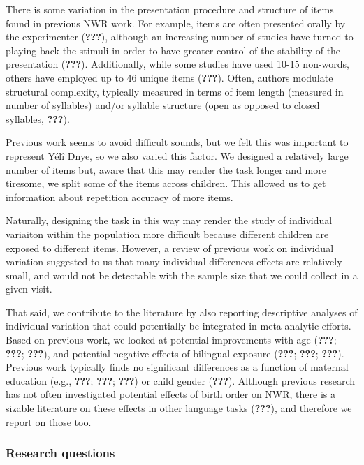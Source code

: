 \documentclass[english,,man,floatsintext]{apa6}
\begin{document}
There is some variation in the presentation procedure and structure of items found in previous NWR work. For example, items are often presented orally by the experimenter ({\textbf{???}}), although an increasing number of studies have turned to playing back the stimuli in order to have greater control of the stability of the presentation ({\textbf{???}}). Additionally, while some studies have used 10-15 non-words, others have employed up to 46 unique items ({\textbf{???}}). Often, authors modulate structural complexity, typically measured in terms of item length (measured in number of syllables) and/or syllable structure (open as opposed to closed syllables, {\textbf{???}}).

Previous work seems to avoid difficult sounds, but we felt this was important to represent Yélî Dnye, so we also varied this factor. We designed a relatively large number of items but, aware that this may render the task longer and more tiresome, we split some of the items across children. This allowed us to get information about repetition accuracy of more items.

Naturally, designing the task in this way may render the study of individual variaiton within the population more difficult because different children are exposed to different items. However, a review of previous work on individual variation suggested to us that many individual differences effects are relatively small, and would not be detectable with the sample size that we could collect in a given visit.

That said, we contribute to the literature by also reporting descriptive analyses of individual variation that could potentially be integrated in meta-analytic efforts. Based on previous work, we looked at potential improvements with age ({\textbf{???}}; {\textbf{???}}; {\textbf{???}}), and potential negative effects of bilingual exposure ({\textbf{???}}; {\textbf{???}}; {\textbf{???}}). Previous work typically finds no significant differences as a function of maternal education (e.g., {\textbf{???}}; {\textbf{???}}; {\textbf{???}}) or child gender ({\textbf{???}}). Although previous research has not often investigated potential effects of birth order on NWR, there is a sizable literature on these effects in other language tasks ({\textbf{???}}), and therefore we report on those too.

\hypertarget{research-questions}{%
\subsubsection{Research questions}\label{research-questions}}
\end{document}
